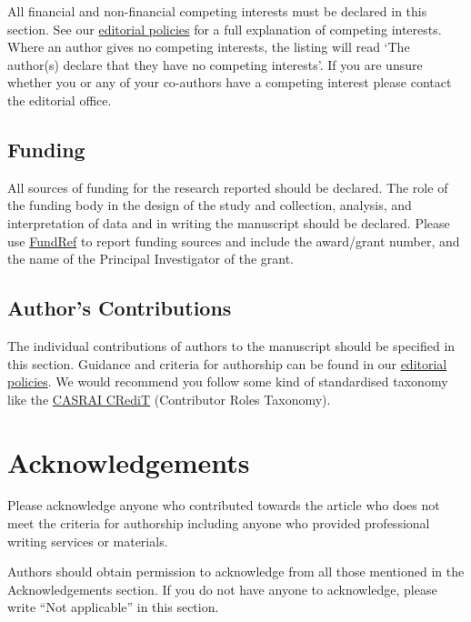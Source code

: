 \documentclass[a4paper,num-refs]{oup-contemporary}
\begin{document}
All financial and non-financial competing interests must be declared in this section. See our \href{https://academic.oup.com/gigascience/pages/editorial_policies_and_reporting_standards}{editorial policies} for a full explanation of competing interests. Where an author gives no competing interests, the listing will read `The author(s) declare that they have no competing interests'. If you are unsure whether you or any of your co-authors have a competing interest please contact the editorial office.


\subsection{Funding}

All sources of funding for the research reported should be declared. The role of the funding body in the design of the study and collection, analysis, and interpretation of data and in writing the manuscript should be declared. Please use \href{http://www.crossref.org/fundingdata/}{FundRef} to report funding sources and include the award/grant number, and the name of the Principal Investigator of the grant.


\subsection{Author's Contributions}

The individual contributions of authors to the manuscript should be specified in this section. Guidance and criteria for authorship can be found in our \href{https://academic.oup.com/gigascience/pages/editorial_policies_and_reporting_standards}{editorial policies}. We would recommend you follow some kind of standardised taxonomy like the \href{http://docs.casrai.org/CRediT}{CASRAI CRediT} (Contributor Roles Taxonomy).


\section{Acknowledgements}

Please acknowledge anyone who contributed towards the article who does not meet the criteria for authorship including anyone who provided professional writing services or materials.

Authors should obtain permission to acknowledge from all those mentioned in the Acknowledgements section. If you do not have anyone to acknowledge, please write ``Not applicable'' in this section.
\end{document}
